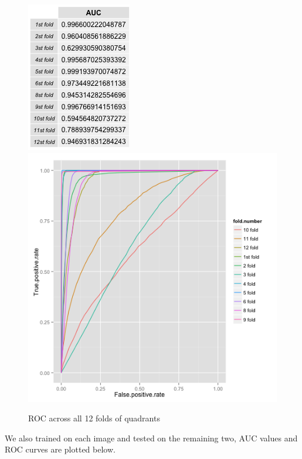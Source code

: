 \documentclass{article}\usepackage[]{graphicx}\usepackage[]{color}
\begin{document}
\begin{figure}[H]
  \includegraphics[width=\linewidth, height = 150pts]{AUC_12_folds.png}
\endminipage\hfill
{}
  \includegraphics[width=\linewidth, height = 150pts]{ROC_fold_comparison.png}
\endminipage
  \caption{ROC across all 12 folds of quadrants}\label{}
\end{figure}

We also trained on each image and tested on the remaining two, AUC values and ROC curves are plotted below.
\end{document}
